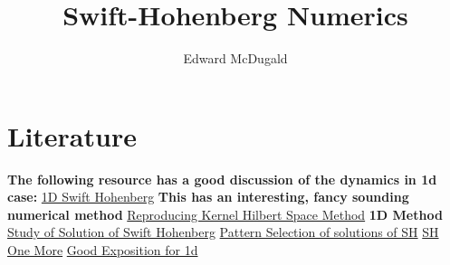 \documentclass[12pt]{article}
\title{Swift-Hohenberg Numerics}
\author{Edward McDugald}
\newcounter{solution}
\begin{document}
\maketitle

\section{Literature}
\textbf{The following resource has a good discussion of the dynamics in 1d case:}
\href{https://gfd.whoi.edu/wp-content/uploads/sites/18/2018/03/KnoblochLecture7_159844.pdf}{1D Swift Hohenberg}\newline
\textbf{This has an interesting, fancy sounding numerical method}
\href{https://link.springer.com/article/10.1007/s40819-021-01132-0}{Reproducing Kernel Hilbert Space Method}\newline
\textbf{1D Method}
\href{https://link.springer.com/article/10.1007/s40819-021-01132-0}{Study of Solution of Swift Hohenberg}\newline
\href{https://citeseerx.ist.psu.edu/viewdoc/download?doi=10.1.1.1061.1125&rep=rep1&type=pdf}{Pattern Selection of solutions of SH}\newline
\href{https://www.uni-muenster.de/Physik.TP/archive/typo3/fileadmin/lehre/NumMethoden/SoSe10/Skript/SH.pdf}{SH}\newline
\href{https://www.hindawi.com/journals/mpe/2020/7012483/}{One More}\newline
\href{https://reader.elsevier.com/reader/sd/pii/S089812211730411X?token=187C5E1AD2FFFBF3EB32B10E8AD5C9E6D43DAE97D12D2F95E11942D160705BE6F9ADDD55C5F4232AD308C1691DC76311&originRegion=us-east-1&originCreation=20220913035117}{Good Exposition for 1d}\newline
\end{document}
